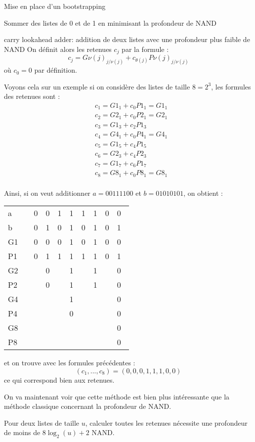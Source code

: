 \begin{section}{Mise en place d'un bootstrapping}
\begin{subsection}{Sommer des listes de 0 et de 1 en minimisant la profondeur de NAND}
\begin{subsubsection}{carry lookahead adder: addition de deux listes avec une profondeur plus faible de NAND}
	On définit alors les retenues $c_j$ par la formule :
\begin{equation}
\label{cla}
c_j = {G\nu(j)}_{j/\nu(j)} + c_{\theta(j)} {P\nu(j)}_{j/\nu(j)}
\end{equation}
	où $c_0 = 0$ par définition.

	Voyons cela sur un exemple si on considère des listes de taille $8 = 2^3$, les formules des retenues sont :
\begin{align*}
&c_1 = {G1_1} + c_0 {P1_1} = {G1_1} \\
&c_2 = {G2_1} + c_0 {P2_1} = {G2_1}  \\
&c_3 = {G1_3} + c_2 {P1_3}\\
&c_4 = {G4_1} + c_0 {P4_1} = {G4_1} \\
&c_5 = {G1_5} + c_4 {P1_5}\\
&c_6 = {G2_3} + c_4 {P2_3} \\
&c_7 = {G1_7} + c_6 {P1_7} \\
&c_8 = {G8_1} + c_0 {P8_1} = {G8_1} \\
\end{align*}

	Ainsi, si on veut additionner $a = 00111100$ et $b = 01010101$, on obtient :
\begin{center}
\begin{tabular}{llllllllll}
a  && 0&0&1&1&1&1&0&0 \\
b  && 0&1&0&1&0&1&0&1 \\
G1 && 0&0&0&1&0&1&0&0 \\
P1 && 0&1&1&1&1&1&0&1 \\
G2 && &0&&1&&1&&0 \\
P2 && &0&&1&&1&&0 \\
G4 && &&&1&&&&0 \\
P4 && &&&0&&&&0 \\
G8 && &&&&&&&0 \\
P8 && &&&&&&&0 \\
\end{tabular}
\end{center}

	et on trouve avec les formules précédentes :
\[ (c_1, ..., c_8) = (0,0,0,1,1,1,0,0) \]
	ce qui correspond bien aux retenues.

	On va maintenant voir que cette méthode est bien plus intéressante que la méthode classique concernant la profondeur de NAND.
\begin{prop}
	Pour deux listes de taille $u$, calculer toutes les retenues nécessite une profondeur de moins de $8 \log_2(u) + 2$ NAND.
\end{prop}


\end{subsubsection}
\end{subsection}
\end{section}
